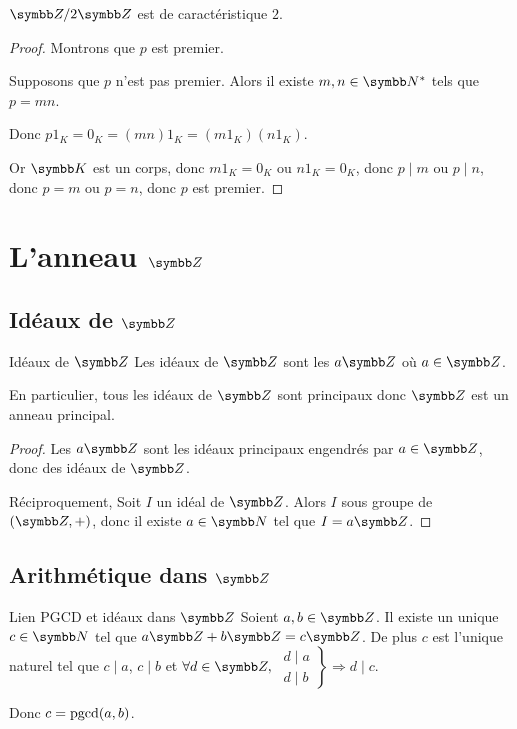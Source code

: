 \begin{exemple}
    $\Z / 2 \Z$ est de caractéristique $2$.
\end{exemple}


\begin{proof}
    Montrons que $p$ est premier. 

    Supposons que $p$ n'est pas premier. Alors il existe $m, n \in \N^*$ tels que 
    $p = mn$. 

    Donc $p1_K = 0_K = (mn)1_K = (m1_K)(n1_K)$.

    Or $\K$ est un corps, donc $m1_K = 0_K$ ou $n1_K = 0_K$, 
    donc $p \mid m$ ou $p \mid n$, donc $p = m$ ou $p = n$, donc $p$ est premier.
\end{proof}

\section{L'anneau \texorpdfstring{$\Z$}{Z}}
\subsection{Idéaux de \texorpdfstring{$\Z$}{Z}}

\begin{theoreme}{Idéaux de $\Z$}{}
    Les idéaux de $\Z$ sont les $a \Z$ où $a \in \Z$.

    En particulier, tous les idéaux de $\Z$ sont principaux donc $\Z$ est un anneau principal.
\end{theoreme}

\begin{proof}
    Les $a \Z$ sont les idéaux principaux engendrés par $a \in \Z$, donc des idéaux de $\Z$.

    Réciproquement, Soit $I$ un idéal de $\Z$. Alors $I$ sous groupe de $(\Z, +)$, donc il existe 
    $a \in \N$ tel que $I = a \Z$.
\end{proof}

\subsection{Arithmétique dans \texorpdfstring{$\Z$}{Z}}

\begin{theoreme}{Lien PGCD et idéaux dans $\Z$}{}
    Soient $a, b \in \Z$. Il existe un unique $c \in \N$ tel que $a \Z + b \Z = c \Z$. 
    De plus $c$ est l'unique naturel tel que $c \mid a $, $c \mid b$ et $\forall d \in \Z, $
    $\left. \begin{aligned}
        d \mid a \\
        d \mid b
    \end{aligned} \right\} \Rightarrow d \mid c$.

    Donc $c = \operatorname{pgcd}(a, b)$.
\end{theoreme}

